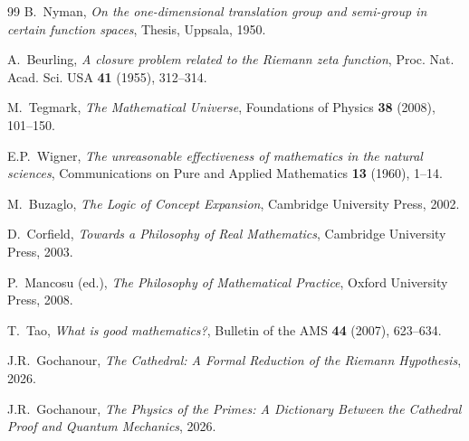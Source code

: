 \documentclass[11pt,a4paper]{article}
\begin{document}
\begin{thebibliography}{99}
B.~Nyman, \emph{On the one-dimensional translation group and
semi-group in certain function spaces}, Thesis, Uppsala, 1950.

A.~Beurling, \emph{A closure problem related to the Riemann zeta
function}, Proc. Nat. Acad. Sci. USA \textbf{41} (1955), 312--314.

M.~Tegmark, \emph{The Mathematical Universe}, Foundations of
Physics \textbf{38} (2008), 101--150.

E.P.~Wigner, \emph{The unreasonable effectiveness of mathematics
in the natural sciences}, Communications on Pure and Applied
Mathematics \textbf{13} (1960), 1--14.

M.~Buzaglo, \emph{The Logic of Concept Expansion}, Cambridge
University Press, 2002.

D.~Corfield, \emph{Towards a Philosophy of Real Mathematics},
Cambridge University Press, 2003.

P.~Mancosu (ed.), \emph{The Philosophy of Mathematical Practice},
Oxford University Press, 2008.

T.~Tao, \emph{What is good mathematics?}, Bulletin of the AMS
\textbf{44} (2007), 623--634.

J.R.~Gochanour, \emph{The Cathedral: A Formal Reduction of the
Riemann Hypothesis}, 2026.

J.R.~Gochanour, \emph{The Physics of the Primes: A Dictionary
Between the Cathedral Proof and Quantum Mechanics}, 2026.

\end{thebibliography}
\end{document}
